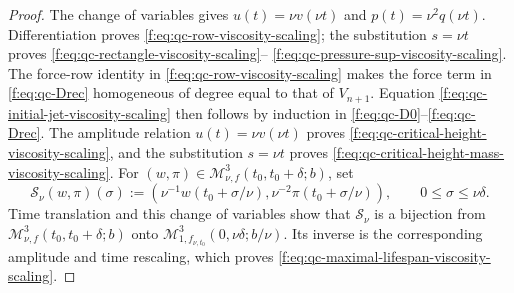 \begin{proof}
The change of variables gives
\(u(t)=\nu v(\nu t)\) and \(p(t)=\nu^2q(\nu t)\).
Differentiation proves \eqref{f:eq:qc-row-viscosity-scaling}; the substitution
\(s=\nu t\) proves
\eqref{f:eq:qc-rectangle-viscosity-scaling}--%
\eqref{f:eq:qc-pressure-sup-viscosity-scaling}.
The force-row identity in \eqref{f:eq:qc-row-viscosity-scaling} makes the
force term in \eqref{f:eq:qc-Drec} homogeneous of degree equal to that of
\(V_{n+1}\).  Equation \eqref{f:eq:qc-initial-jet-viscosity-scaling} then
follows by induction in \eqref{f:eq:qc-D0}--\eqref{f:eq:qc-Drec}.  The amplitude relation
\(u(t)=\nu v(\nu t)\) proves
\eqref{f:eq:qc-critical-height-viscosity-scaling}, and the substitution
\(s=\nu t\) proves
\eqref{f:eq:qc-critical-height-mass-viscosity-scaling}.  For
\((w,\pi)\in\mathscr M_{\nu,f}^3(t_0,t_0+\delta;b)\), set
\[
 \mathcal S_\nu(w,\pi)(\sigma)
 :=
 \left(
  \nu^{-1}w(t_0+\sigma/\nu),
  \nu^{-2}\pi(t_0+\sigma/\nu)
 \right),
 \qquad 0\le\sigma\le\nu\delta.
\]
Time translation and this change of variables show that
\(\mathcal S_\nu\) is a bijection from
\(\mathscr M_{\nu,f}^3(t_0,t_0+\delta;b)\) onto
\(\mathscr M_{1,f_{\nu,t_0}}^3(0,\nu\delta;b/\nu)\).
Its inverse is the corresponding amplitude and time rescaling,
which proves \eqref{f:eq:qc-maximal-lifespan-viscosity-scaling}.
\end{proof}

